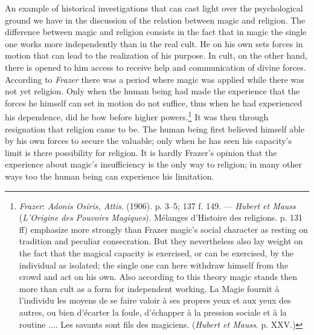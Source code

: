 \documentclass[12pt,a4paper]{book}
\newcommand{\opage}[1]{\marginnote{\footnotesize\textit{[#1]}}}
\begin{document}
An example of historical investigations that can cast light over the psychological ground we have in the
discussion of the relation between magic and religion. The difference between magic and religion consists in
the fact that in magic the single one works more independently than in the real cult. He on his own sets
forces in motion that can lead to the realization of his purpose. In cult, on the other hand, there is opened
to him access to receive help and communication of divine forces. According to \emph{Frazer} there was a
period where magic was applied while there was not yet religion. Only when the human being had made the
experience \opage{390}that the forces he himself can set in motion do not suffice, thus when he had experienced his
dependence, did he bow before higher powers.\footnote{\emph{Frazer}: \emph{Adonis Osiris, Attis}. (1906). p.
3--5; 137 f. 149. --- \emph{Hubert et Mauss} (\emph{L'Origine des Pouvoirs Magiques}). Mélanges d'Histoire
des religions. p. 131 ff) emphasize more strongly than Frazer magic's social character as resting on tradition
and peculiar consecration. But they nevertheless also lay weight on the fact that the magical capacity is
exercised, or can be exercised, by the individual as isolated; the single one can here withdraw himself from
the crowd and act on his own. Also according to this theory magic stands then more than cult as a form for
independent working. La Magie fournit à l'individu les moyens de se faire valoir à ses propres yeux et aux
yeux des autres, ou bien d'écarter la foule, d'échapper à la pression sociale et à la routine .... Les savants
sont fils des magiciens. (\emph{Hubert et Mauss}. p. XXV.)} It was then through resignation that religion came
to be. The human being first believed himself able by his own forces to secure the valuable; only when he has
seen his capacity's limit is there possibility for religion. It is hardly Frazer's opinion that the experience
about magic's insufficiency is the only way to religion; in many other ways too the human being can experience
his limitation.
\end{document}

